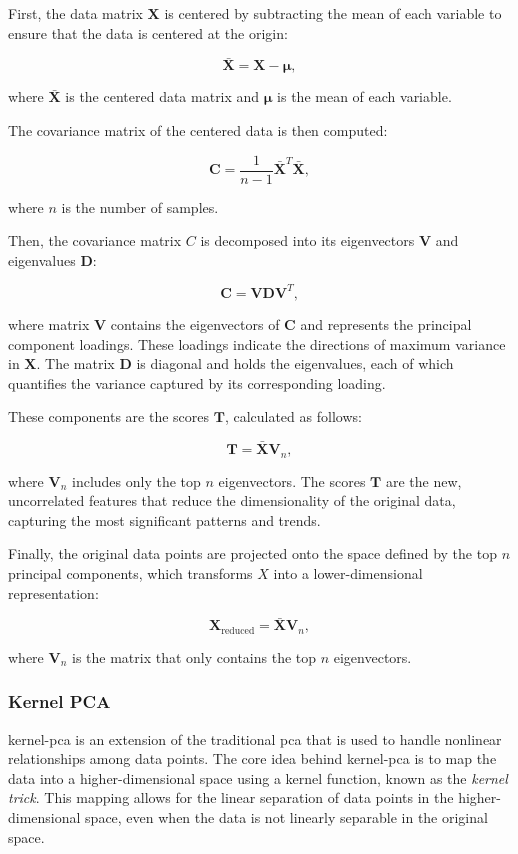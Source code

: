 First, the data matrix $\mathbf{X}$ is centered by subtracting the mean of each variable to ensure that the data is centered at the origin:

$$
\mathbf{\bar{X}} = \mathbf{X} - \mathbf{\mu},
$$

where $\mathbf{\bar{X}}$ is the centered data matrix and $\mathbf{\mu}$ is the mean of each variable.

The covariance matrix of the centered data is then computed:

$$
\mathbf{C} = \frac{1}{n-1} \mathbf{\bar{X}}^T \mathbf{\bar{X}},
$$

where $n$ is the number of samples.

Then, the covariance matrix $C$ is decomposed into its eigenvectors $\mathbf{V}$ and eigenvalues $\mathbf{D}$:

$$
\mathbf{C} = \mathbf{V} \mathbf{D} \mathbf{V}^T,
$$

where matrix $\mathbf{V}$ contains the eigenvectors of $\mathbf{C}$ and represents the principal component loadings.
These loadings indicate the directions of maximum variance in $\mathbf{X}$.
The matrix $\mathbf{D}$ is diagonal and holds the eigenvalues, each of which quantifies the variance captured by its corresponding loading.

These components are the scores $\mathbf{T}$, calculated as follows:

$$
\mathbf{T} = \mathbf{\bar{X}} \mathbf{V}_n,
$$

where $\mathbf{V}_n$ includes only the top $n$ eigenvectors.
The scores $\mathbf{T}$ are the new, uncorrelated features that reduce the dimensionality of the original data, capturing the most significant patterns and trends.

Finally, the original data points are projected onto the space defined by the top $n$ principal components, which transforms $X$ into a lower-dimensional representation:

$$
\mathbf{X}_{\text{reduced}} = \mathbf{\bar{X}} \mathbf{V}_n,
$$

where $\mathbf{V}_n$ is the matrix that only contains the top $n$ eigenvectors.

\subsubsection{Kernel PCA}
\gls{kernel-pca} is an extension of the traditional \gls{pca} that is used to handle nonlinear relationships among data points.
The core idea behind \gls{kernel-pca} is to map the data into a higher-dimensional space using a kernel function, known as the \textit{kernel trick}. 
This mapping allows for the linear separation of data points in the higher-dimensional space, even when the data is not linearly separable in the original space.

